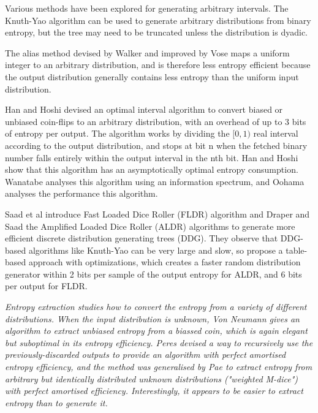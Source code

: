 \documentclass[12pt]{article}
\begin{document}
Various methods have been explored for generating arbitrary intervals.
The Knuth-Yao algorithm can be used to generate arbitrary distributions from binary entropy, but the tree may need to be truncated unless the distribution is dyadic.

The alias method devised by Walker \cite{walker1977efficient} and improved by Vose \cite{vose91} maps a uniform integer to an arbitrary distribution, and is therefore less entropy efficient because the output distribution generally contains less entropy than the uniform input distribution.

Han and Hoshi \cite{han97} devised an optimal interval algorithm to convert biased or unbiased coin-flips to an arbitrary distribution, with an overhead of up to 3 bits of entropy per output.  The algorithm works by dividing the $[0,1)$ real interval according to the output distribution, and stops at bit n when the fetched binary number falls entirely within the output interval in the nth bit. Han and Hoshi show that this algorithm has an asymptotically optimal entropy consumption. 
Wanatabe \cite{wanatabe20} analyses this algorithm using an information spectrum, and Oohama \cite{oohama11, oohama2020performance} analyses the performance this algorithm.

Saad et al \cite{saad2020fldr} introduce Fast Loaded Dice Roller (FLDR) algorithm and Draper and Saad \cite{draper2025efficient} the Amplified Loaded Dice Roller (ALDR) algorithms to generate more efficient discrete distribution generating trees (DDG). They observe that DDG-based algorithms like Knuth-Yao can be very large and slow, so propose a table-based approach with optimizations, which creates a faster random distribution generator within 2 bits per sample of the output entropy for ALDR, and 6 bits per output for FLDR.

\em Entropy extraction \em studies how to convert the entropy \em from \em a variety of different distributions. When the input distribution is unknown, Von Neumann \cite{neumann51} gives an algorithm to extract unbiased entropy from a biassed coin, which is again elegant but suboptimal in its entropy efficiency. Peres \cite{peres1992iterating} devised a way to recursively use the previously-discarded outputs to provide an algorithm with perfect amortised entropy efficiency, and the method was generalised by Pae \cite{pae15} to extract entropy from arbitrary but identically distributed unknown distributions ("weighted M-dice") with perfect amortised efficiency. Interestingly, it appears to be easier to extract entropy than to generate it.
\end{document}
